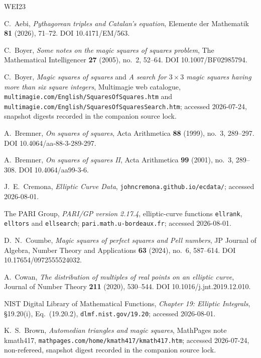 
\begingroup\raggedright
\begin{thebibliography}{WEI23}

 C.~Aebi, \emph{Pythagorean triples and Catalan's
equation}, Elemente der Mathematik \textbf{81} (2026), 71--72.
DOI 10.4171/EM/563.

 C.~Boyer, \emph{Some notes on the magic squares of
squares problem}, The Mathematical Intelligencer \textbf{27} (2005), no.~2,
52--64. DOI 10.1007/BF02985794.

 C.~Boyer, \emph{Magic squares of squares} and
\emph{A search for $3\times3$ magic squares having more than six square
integers}, Multimagie web catalogue,
\texttt{multimagie.com/English/SquaresOfSquares.htm} and
\texttt{multimagie.com/English/SquaresOfSquaresSearch.htm}; accessed
2026-07-24, snapshot digests recorded in the companion source lock.

 A.~Bremner, \emph{On squares of squares}, Acta
Arithmetica \textbf{88} (1999), no.~3, 289--297.
DOI 10.4064/aa-88-3-289-297.

 A.~Bremner, \emph{On squares of squares II}, Acta
Arithmetica \textbf{99} (2001), no.~3, 289--308. DOI 10.4064/aa99-3-6.

 J.~E.~Cremona, \emph{Elliptic Curve Data},
\texttt{johncremona.github.io/ecdata/}; accessed 2026-08-01.

 The PARI Group, \emph{PARI/GP version 2.17.4},
elliptic-curve functions \texttt{ellrank}, \texttt{elltors} and
\texttt{ellsearch}; \texttt{pari.math.u-bordeaux.fr}; accessed 2026-08-01.

 D.~N.~Coumbe, \emph{Magic squares of perfect
squares and Pell numbers}, JP Journal of Algebra, Number Theory and
Applications \textbf{63} (2024), no.~6, 587--614.
DOI 10.17654/0972555524032.

 A.~Cowan, \emph{The distribution of multiples of
real points on an elliptic curve}, Journal of Number Theory \textbf{211}
(2020), 530--544. DOI 10.1016/j.jnt.2019.12.010.

 NIST Digital Library of Mathematical Functions,
\emph{Chapter 19: Elliptic Integrals}, \S19.20(i), Eq.~(19.20.2),
\texttt{dlmf.nist.gov/19.20}; accessed 2026-08-01.

 K.~S.~Brown, \emph{Automedian triangles and magic
squares}, MathPages note kmath417,
\texttt{mathpages.com/home/kmath417/kmath417.htm}; accessed 2026-07-24,
non-refereed, snapshot digest recorded in the companion source lock.


\end{thebibliography}
